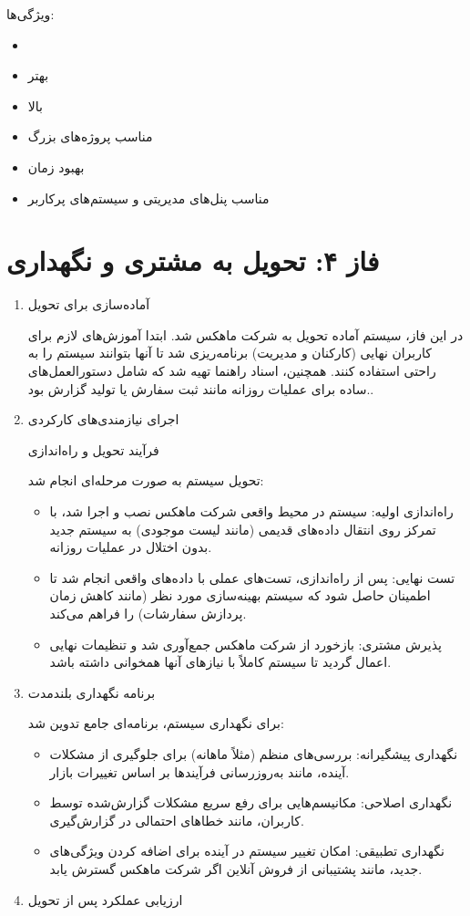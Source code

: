 \documentclass[12pt,a4paper]{report}
\begin{document}
\begin{enumerate}
\begin{itemize}
ویژگی‌ها:
\begin{itemize}
	\item 
{}
\item 
{} بهتر
\item 
{} بالا
\item 
مناسب پروژه‌های بزرگ
\item 
بهبود زمان 
\item 
مناسب پنل‌های مدیریتی و سیستم‌های پرکاربر
\end{itemize}
\end{itemize}
\end{enumerate}
\section{ فاز ۴: تحویل به مشتری و نگهداری}
\begin{enumerate}
	\item 
آماده‌سازی برای تحویل

در این فاز، سیستم آماده تحویل به شرکت ماهکس شد. ابتدا آموزش‌های لازم برای کاربران نهایی (کارکنان و مدیریت) برنامه‌ریزی شد تا آنها بتوانند سیستم را به راحتی استفاده کنند. همچنین، اسناد راهنما تهیه شد که شامل دستورالعمل‌های ساده برای عملیات روزانه مانند ثبت سفارش یا تولید گزارش بود..
	
	
	\item اجرای نیازمندی‌های کارکردی
	
فرآیند تحویل و راه‌اندازی

تحویل سیستم به صورت مرحله‌ای انجام شد:

	\begin{itemize}
		\item 
راه‌اندازی اولیه: سیستم در محیط واقعی شرکت ماهکس نصب و اجرا شد، با تمرکز روی انتقال داده‌های قدیمی (مانند لیست موجودی) به سیستم جدید بدون اختلال در عملیات روزانه.
		\item 
تست نهایی: پس از راه‌اندازی، تست‌های عملی با داده‌های واقعی انجام شد تا اطمینان حاصل شود که سیستم بهینه‌سازی مورد نظر (مانند کاهش زمان پردازش سفارشات) را فراهم می‌کند.
		\item 
پذیرش مشتری: بازخورد از شرکت ماهکس جمع‌آوری شد و تنظیمات نهایی اعمال گردید تا سیستم کاملاً با نیازهای آنها همخوانی داشته باشد.
	\end{itemize}
	\item 
برنامه نگهداری بلندمدت

برای نگهداری سیستم، برنامه‌ای جامع تدوین شد:
	



	\begin{itemize}
		\item 
	نگهداری پیشگیرانه: بررسی‌های منظم (مثلاً ماهانه) برای جلوگیری از مشکلات آینده، مانند به‌روزرسانی فرآیندها بر اساس تغییرات بازار.
		\item 
	نگهداری اصلاحی: مکانیسم‌هایی برای رفع سریع مشکلات گزارش‌شده توسط کاربران، مانند خطاهای احتمالی در گزارش‌گیری.
		\item 
	نگهداری تطبیقی: امکان تغییر سیستم در آینده برای اضافه کردن ویژگی‌های جدید، مانند پشتیبانی از فروش آنلاین اگر شرکت ماهکس گسترش یابد.
	\end{itemize}
	\item 
ارزیابی عملکرد پس از تحویل


\end{enumerate}
\end{document}
